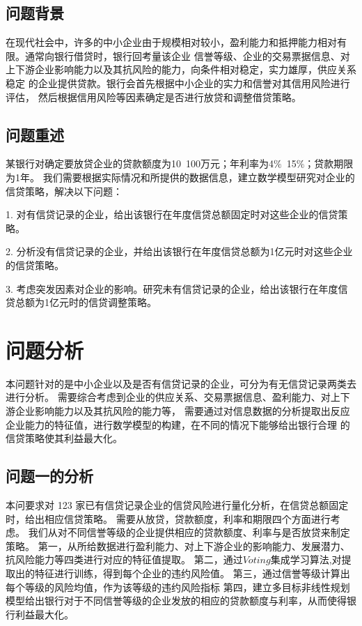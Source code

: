 \documentclass[UTF8]{ctexart}
\begin{document}
		\subsection{问题背景}
		在现代社会中，许多的中小企业由于规模相对较小，盈利能力和抵押能力相对有限。通常向银行借贷时，银行回考量该企业
		信誉等级、企业的交易票据信息、对上下游企业影响能力以及其抗风险的能力，向条件相对稳定，实力雄厚，供应关系稳定
		的企业提供贷款。银行会首先根据中小企业的实力和信誉对其信用风险进行评估，
		然后根据信用风险等因素确定是否进行放贷和调整借贷策略。
		
		\subsection{问题重述}
		某银行对确定要放贷企业的贷款额度为10~100万元；年利率为4$\%$~15$\%$；贷款期限为1年。
		我们需要根据实际情况和所提供的数据信息，建立数学模型研究对企业的信贷策略，解决以下问题：
		
		1. 对有信贷记录的企业，给出该银行在年度信贷总额固定时对这些企业的信贷策略。
		
		2. 分析没有信贷记录的企业，并给出该银行在年度信贷总额为1亿元时对这些企业的信贷策略。
		
		3. 考虑突发因素对企业的影响。研究未有信贷记录的企业，给出该银行在年度信贷总额为1亿元时的信贷调整策略。
		
		
		\section{问题分析}
		本问题针对的是中小企业以及是否有信贷记录的企业，可分为有无信贷记录两类去进行分析。
		需要综合考虑到企业的供应关系、交易票据信息、盈利能力、对上下游企业影响能力以及其抗风险的能力等，
		需要通过对信息数据的分析提取出反应企业能力的特征值，进行数学模型的构建，在不同的情况下能够给出银行合理
		的信贷策略使其利益最大化。
		\subsection{问题一的分析}
		本问要求对 123 家已有信贷记录企业的信贷风险进行量化分析，在信贷总额固定时，给出相应信贷策略。
		需要从放贷，贷款额度，利率和期限四个方面进行考虑。
		我们从对不同信誉等级的企业提供相应的贷款额度、利率与是否放贷来制定策略。
		第一，从所给数据进行盈利能力、对上下游企业的影响能力、发展潜力、抗风险能力等四类进行对应的特征值提取。
		第二，通过$Voting$集成学习算法,对提取出的特征进行训练，得到每个企业的违约风险值。
		第三，通过信誉等级计算出每个等级的风险均值，作为该等级的违约风险指标
		第四，建立多目标非线性规划模型给出银行对于不同信誉等级的企业发放的相应的贷款额度与利率，从而使得银行利益最大化。
\end{document}
